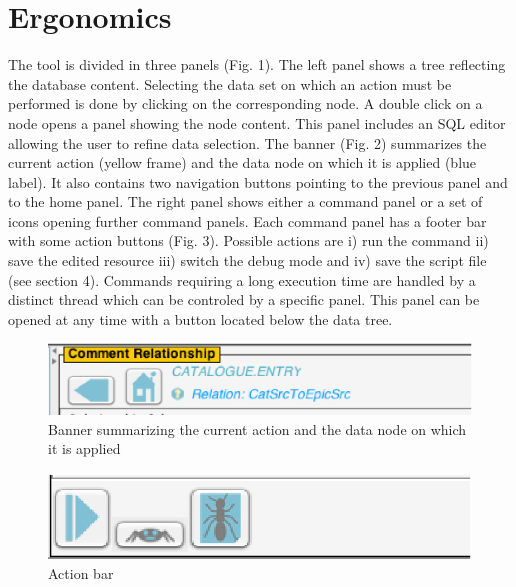 \documentclass[11pt,twoside]{article}
\begin{document}
\section{Ergonomics}
The tool is divided in three panels (Fig. 1). The left panel shows a tree reflecting the database content. Selecting the data set on which an action must be performed is done by clicking on the corresponding node.
A double click on a node opens a panel showing the node content. This panel includes an SQL editor allowing the user to refine data selection. The banner (Fig. 2)  summarizes the current action (yellow frame) and the data node on which it is applied (blue label). It also contains two navigation buttons pointing to the previous panel and to the home panel. The right panel shows either a command panel or a set of icons opening further command panels. Each command panel has a footer bar with some action buttons (Fig. 3). Possible actions are i) run the command ii) save the edited resource iii) switch the debug mode and iv) save the script file (see section 4). Commands requiring a long execution time are handled by a distinct thread which can be controled by a specific panel. This panel can be opened at any time with a button located below the data tree.

\begin{figure}[!h]
	\begin{center}
		\includegraphics[height=0.10\textwidth]{P18_fig2.eps}
	\end{center}
	\caption{Banner summarizing the current action and the data node on which it is applied}
	\label{fig:fig2}
\end{figure}

\begin{figure}[!h]
	\begin{center}
		\includegraphics[height=0.10\textwidth]{P18_fig3.eps}
	\end{center}
	\caption{Action bar}
	\label{fig:fig3 (fig. 4)}
\end{figure}
\end{document}
